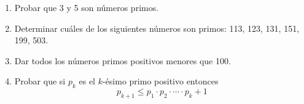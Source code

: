 \documentclass[12pt,spanish,makeidx]{amsbook}
\begin{document}
\begin{enumerate}
\smallskip

\item Probar que 3  y 5 son n\'umeros primos.

\smallskip

\item Determinar cu\'ales de los siguientes n\'umeros son primos: 113, 123, 131, 151, 199, 503.

\smallskip

\item  Dar todos los n\'umeros primos positivos menores que 100.

\smallskip
\item Probar que si $p_k$ es el $k$-\'esimo primo positivo entonces
$$p_{k+1}\leq p_1\cdot p_2\cdot \cdots \cdot p_k+1$$



\end{enumerate}
\end{document}
